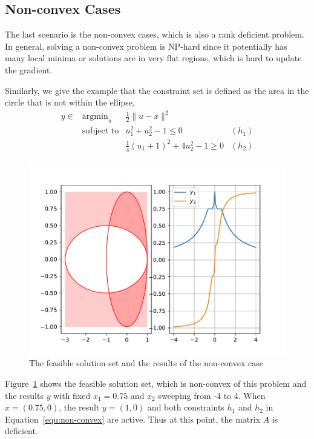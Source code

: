 \subsection{Non-convex Cases}
The last scenario is the non-convex cases, which is also a rank deficient problem. In general, solving a non-convex problem is NP-hard since it potentially has many local minima or solutions are in very flat regions, which is hard to update the gradient. 
\par Similarly, we give the example that the constraint set is defined as the area in the circle that is not within the ellipse,
\begin{equation}
    \label{equ:non-convex}
    \begin{array}{llll}
        y \in & \text{argmin}_u & \frac{1}{2} \|u - x\|^2 \\
        & \text{subject to} & u_1^2 + u_2^2 - 1 \leq 0 & (h_1) \\
        & & \frac{1}{4}(u_1 + 1)^2 + 4 u_2^2 - 1 \geq 0 & (h_2)
    \end{array}
\end{equation}
\begin{figure}[t]
    \label{fig:non-convex}
    \centering
    \includegraphics[page=1, width=.8\textwidth]{figs/nonconvex.pdf}
    \caption{The feasible solution set and the results of the non-convex case}
\end{figure}
\par Figure~\ref{fig:non-convex} shows the feasible solution set, which is non-convex of this problem and the results $y$ with fixed $x_1 =0.75$ and $x_2$ sweeping from -4 to 4. When $x = (0.75, 0)$, the result $y = (1, 0)$ and both constraints $h_1$ and $h_2$ in Equation~\ref{equ:non-convex} are active. Thus at this point, the matrix $A$ is deficient.
